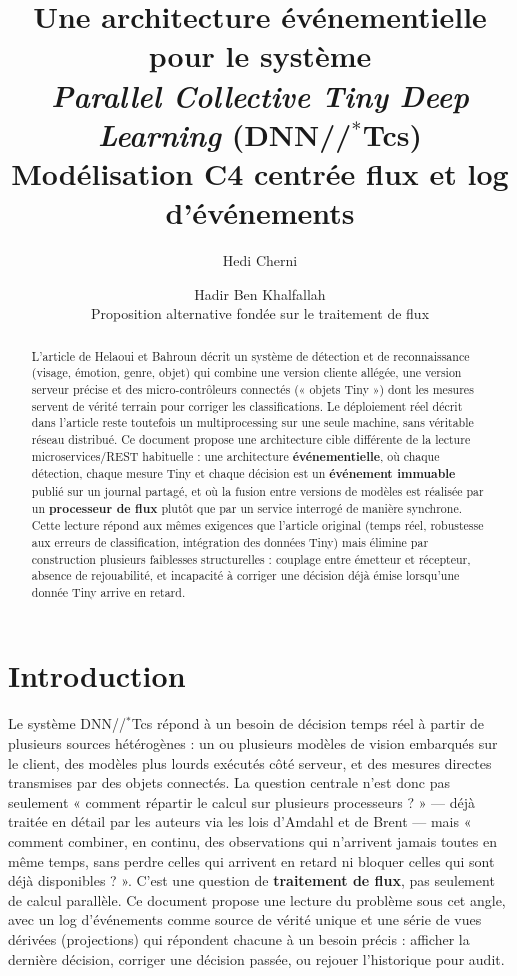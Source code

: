 \documentclass[11pt,a4paper]{article}
\title{\bfseries Une architecture événementielle pour le système\\[2pt]
\textit{Parallel Collective Tiny Deep Learning} (DNN//$^{*}$Tcs)\\[6pt]
\large Modélisation C4 centrée flux et log d'événements}
\author{Hedi Cherni \and Hadir Ben Khalfallah\\[4pt]\normalsize Proposition alternative fondée sur le traitement de flux}
\date{}
\begin{document}
\maketitle
\thispagestyle{fancy}

\begin{abstract}
\noindent
L'article de Helaoui et Bahroun décrit un système de détection et de reconnaissance
(visage, émotion, genre, objet) qui combine une version cliente allégée, une version serveur
précise et des micro-contrôleurs connectés (« objets Tiny ») dont les mesures servent de
vérité terrain pour corriger les classifications. Le déploiement réel décrit dans l'article
reste toutefois un multiprocessing sur une seule machine, sans véritable réseau distribué.
Ce document propose une architecture cible différente de la lecture microservices/REST
habituelle : une architecture \textbf{événementielle}, où chaque détection, chaque mesure Tiny
et chaque décision est un \textbf{événement immuable} publié sur un journal partagé, et où la
fusion entre versions de modèles est réalisée par un \textbf{processeur de flux} plutôt que par
un service interrogé de manière synchrone. Cette lecture répond aux mêmes exigences que
l'article original (temps réel, robustesse aux erreurs de classification, intégration des
données Tiny) mais élimine par construction plusieurs faiblesses structurelles : couplage entre
émetteur et récepteur, absence de rejouabilité, et incapacité à corriger une décision déjà
émise lorsqu'une donnée Tiny arrive en retard.
\end{abstract}

\tableofcontents

\section{Introduction}

Le système DNN//$^{*}$Tcs répond à un besoin de décision temps réel à partir de plusieurs
sources hétérogènes : un ou plusieurs modèles de vision embarqués sur le client, des modèles
plus lourds exécutés côté serveur, et des mesures directes transmises par des objets connectés.
La question centrale n'est donc pas seulement « comment répartir le calcul sur plusieurs
processeurs ? » --- déjà traitée en détail par les auteurs via les lois d'Amdahl et de Brent
--- mais « comment combiner, en continu, des observations qui n'arrivent jamais toutes en même
temps, sans perdre celles qui arrivent en retard ni bloquer celles qui sont déjà disponibles ? ».
C'est une question de \textbf{traitement de flux}, pas seulement de calcul parallèle. Ce
document propose une lecture du problème sous cet angle, avec un log d'événements comme
source de vérité unique et une série de vues dérivées (projections) qui répondent chacune à un
besoin précis : afficher la dernière décision, corriger une décision passée, ou rejouer
l'historique pour audit.
\end{document}
